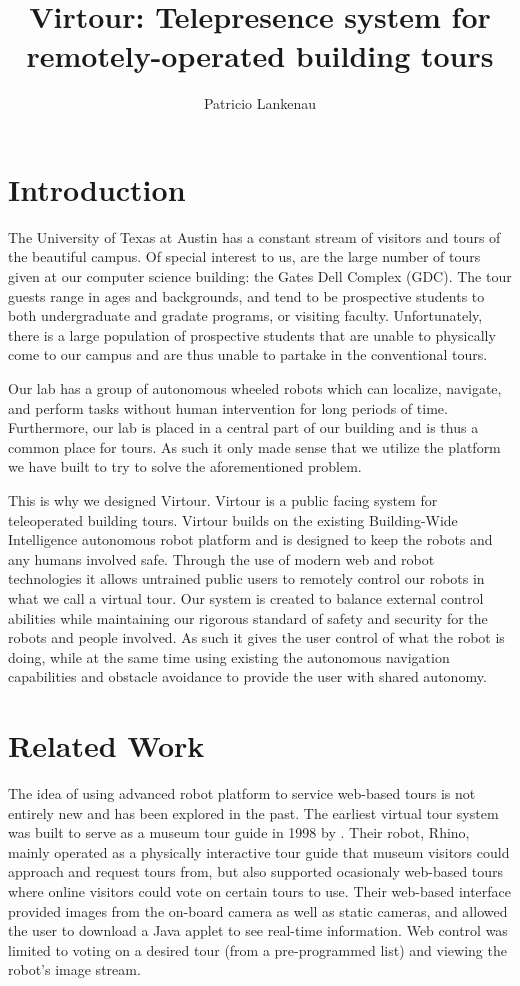 \documentclass[
  oneside,
  11pt, a4paper,
  footinclude=true,
  headinclude=true,
  cleardoublepage=empty
]{article}
\title{Virtour: Telepresence system for remotely-operated building tours}
\author{Patricio Lankenau}
\begin{document}
\maketitle

\section{Introduction}

The University of Texas at Austin has a constant stream of visitors and tours
of the beautiful campus. Of special interest to us, are the large number of
tours given at our computer science building: the Gates Dell Complex (GDC). The
tour guests range in ages and backgrounds, and tend to be prospective students
to both undergraduate and gradate programs, or visiting faculty. Unfortunately,
there is a large population of prospective students that are unable to
physically come to our campus and are thus unable to partake in the
conventional tours.

Our lab has a group of autonomous wheeled robots which can localize, navigate,
and perform tasks without human intervention for long periods of time.
Furthermore, our lab is placed in a central part of our building and is thus a
common place for tours. As such it only made sense that we utilize the platform
we have built to try to solve the aforementioned problem.

This is why we designed Virtour. Virtour is a public facing system for
teleoperated building tours. Virtour builds on the existing Building-Wide
Intelligence autonomous robot platform and is designed to keep the robots and
any humans involved safe. Through the use of modern web and robot technologies
it allows untrained public users to remotely control our robots in what we call
a virtual tour. Our system is created to balance external control abilities
while maintaining our rigorous standard of safety and security for the robots
and people involved. As such it gives the user control of what the robot is
doing, while at the same time using existing the autonomous navigation
capabilities and obstacle avoidance to provide the user with shared autonomy.

\section{Related Work}

The idea of using advanced robot platform to service web-based tours is not
entirely new and has been explored in the past. The earliest virtual tour
system was built to serve as a museum tour guide in 1998 by \cite{burgard1998}.
Their robot, Rhino, mainly operated as a physically interactive tour guide that
museum visitors could approach and request tours from, but also supported
ocasionaly web-based tours where online visitors could vote on certain tours to
use. Their web-based interface provided images from the on-board camera as well
as static cameras, and allowed the user to download a Java applet to see
real-time information. Web control was limited to voting on a desired tour
(from a pre-programmed list) and viewing the robot's image stream.
\end{document}
